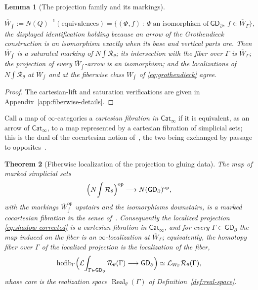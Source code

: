 \documentclass[11pt,letterpaper,twoside]{article}
\theoremstyle{plain}
\newtheorem{theorem}{Theorem}[section]
\newtheorem{lemma}[theorem]{Lemma}
\theoremstyle{definition}
\theoremstyle{remark}
\let\cite\citep
\newcommand{\BGrm}{\mathsf{GD}_{\partial}}
\newcommand{\Real}{\operatorname{Real}}
\begin{document}
\begin{lemma}[The projection family and its markings]
\begin{enumerate}
\begin{equation}\label{eq:shadow-marking}
 \overline W_{\int}:=N(Q)^{-1}(\text{equivalences})
 =\bigl\{(\Phi,f)\ :\ \Phi\ \text{an isomorphism of}\ \BGrm,\ f\in\overline W_\Gamma\bigr\},
\end{equation}
the displayed identification holding because an arrow of the Grothendieck construction is an isomorphism exactly when its base and vertical parts are.  Then \(\overline W_{\int}\) is a saturated marking of \(N\!\int\mathcal R_\theta\); its intersection with the fiber over \(\Gamma\) is \(\overline W_\Gamma\); the projection of every \(\overline W_{\int}\)-arrow is an isomorphism; and the localizations of \(N\!\int\mathcal R_\theta\) at \(\overline W_{\int}\) and at the fiberwise class \(W_{\int}\) of \eqref{eq:grothendieck} agree.
\end{enumerate}
\end{lemma}

\begin{proof}
The cartesian-lift and saturation verifications are given in Appendix~\ref{app:fiberwise-details}.
\end{proof}

Call a map of \(\infty\)-categories a \emph{cartesian fibration in \(\mathsf{Cat}_\infty\)} if it is equivalent, as an arrow of \(\mathsf{Cat}_\infty\), to a map represented by a cartesian fibration of simplicial sets; this is the dual of the cocartesian notion of~\cite[Def.~2.1.3]{hinich2016}, the two being exchanged by passage to opposites~\cite[Tag~01UD]{kerodon}.

\begin{theorem}[Fiberwise localization of the projection to gluing data]\label{thm:fiberwise-localization}
The map of marked simplicial sets
\[
 \Bigl(N\!\int\mathcal R_\theta\Bigr)^{\mathrm{op}}\longrightarrow N(\BGrm)^{\mathrm{op}},
\]
with the markings \(\overline W_{\int}^{\mathrm{op}}\) upstairs and the isomorphisms downstairs, is a marked cocartesian fibration in the sense of~\cite[Def.~2.1.1]{hinich2016}.  Consequently the localized projection \eqref{eq:shadow-corrected} is a cartesian fibration in \(\mathsf{Cat}_\infty\), and for every \(\Gamma\in\BGrm\) the map induced on the fiber is an \(\infty\)-localization at \(\overline W_\Gamma\); equivalently, the homotopy fiber over \(\Gamma\) of the localized projection is the localization of the fiber,
\begin{equation}\label{eq:fiber-comparison}
 \operatorname{hofib}_\Gamma\Bigl(\mathcal L\!\int_{\Gamma\in\BGrm}\mathcal R_\theta(\Gamma)\longrightarrow\BGrm\Bigr)
 \simeq
 \mathcal L_{W_\Gamma}\mathcal R_\theta(\Gamma),
\end{equation}
whose core is the realization space \(\Real_\theta(\Gamma)\) of Definition~\ref{def:real-space}.
\end{theorem}
\end{document}
